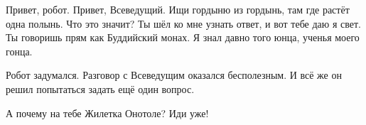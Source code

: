 \begin{dialog}
\X Привет, робот.
\R Привет, Всеведущий.
\X Ищи гордыню из гордынь, там где растёт одна полынь.
\R Что это значит?
\X Ты шёл ко мне узнать ответ, и вот тебе даю я свет.
\R Ты говоришь прям как Буддийский монах.
\X Я знал давно того юнца, ученья моего гонца.
\end{dialog}

\begin{monolog}
Робот задумался. Разговор с Всеведущим оказался бесполезным. И всё же он решил попытаться задать ещё один вопрос.
\end{monolog}

\begin{dialog}
\R А почему на тебе Жилетка Онотоле?
\X Иди уже!
\end{dialog}